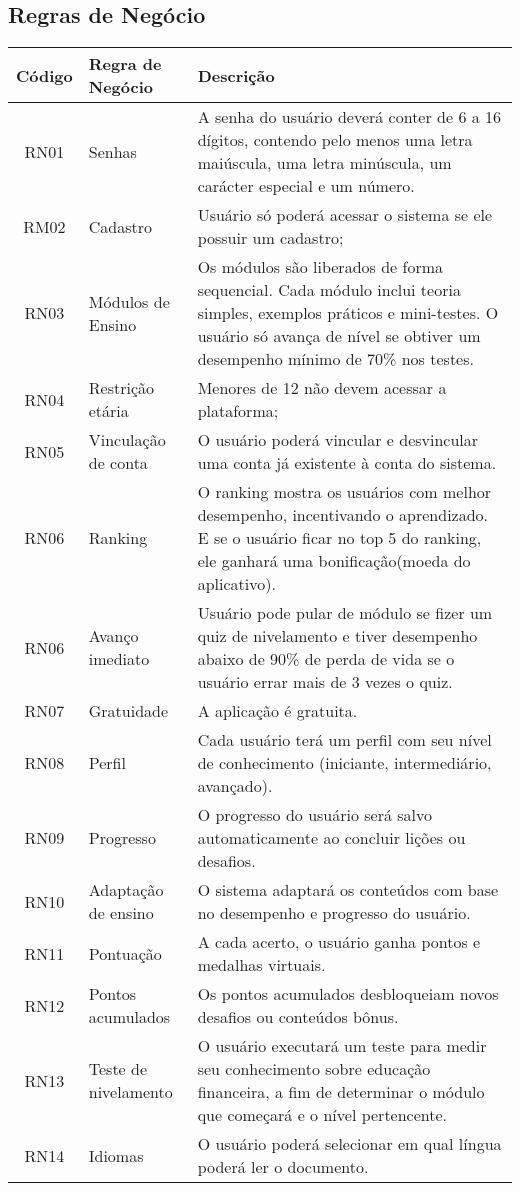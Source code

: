 \documentclass[
	article,			%
	12pt,				%
	oneside,			%
	a4paper,			%
	english,			%
	brazil,				%
	sumario=tradicional
	]{abntex2}
\begin{document}
\subsection{Regras de Negócio}

\begin{center}
\vspace{-0.0cm}

\begin{tabular}{|c|l|p{8cm}|}
\hline
\textbf{Código} & \textbf{Regra de Negócio} & \textbf{Descrição} \\
\hline
RN01 & Senhas & A senha do usuário deverá conter de 6 a 16 dígitos, contendo pelo menos uma letra maiúscula, uma letra minúscula, um carácter especial e um número. \\
\hline
RM02 & Cadastro & Usuário só poderá acessar o sistema se ele possuir um cadastro; \\
\hline
RN03 & Módulos de Ensino & Os módulos são liberados de forma sequencial. Cada módulo inclui teoria simples, exemplos práticos e mini-testes. O usuário só avança de nível se obtiver um desempenho mínimo de 70\% nos testes. \\
\hline
RN04 & Restrição etária & Menores de 12 não devem acessar a plataforma; \\
\hline
RN05 & Vinculação de conta & O usuário poderá vincular e desvincular uma conta já existente à conta do sistema. \\
\hline
RN06 & Ranking &  O ranking mostra os usuários com melhor desempenho, incentivando o aprendizado. E se o usuário ficar no top 5 do ranking, ele ganhará uma bonificação(moeda do aplicativo). \\
\hline
RN06 & Avanço imediato & Usuário pode pular de módulo se fizer um quiz de nivelamento e tiver desempenho abaixo de 90\% de perda de vida se o usuário errar mais de 3 vezes o quiz.\\
\hline
RN07 & Gratuidade & A aplicação é gratuita.\\
\hline
RN08 & Perfil & Cada usuário terá um perfil com seu nível de conhecimento (iniciante, intermediário, avançado).\\
\hline
RN09 & Progresso & O progresso do usuário será salvo automaticamente ao concluir lições ou desafios. \\
\hline
RN10 & Adaptação de ensino & O sistema adaptará os conteúdos com base no desempenho e progresso do usuário.\\
\hline
RN11 & Pontuação & A cada acerto, o usuário ganha pontos e medalhas virtuais. \\
\hline
RN12 & Pontos acumulados & Os pontos acumulados desbloqueiam novos desafios ou conteúdos bônus. \\
\hline
RN13 & Teste de nivelamento & O usuário executará um teste para medir seu conhecimento sobre educação financeira, a fim de determinar o módulo que começará e o nível pertencente. \\
\hline
RN14 & Idiomas & O usuário poderá selecionar em qual língua poderá ler o documento. \\
\hline
\end{tabular}
\end{center}
\end{document}
